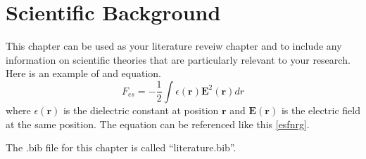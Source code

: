 \chapter{Scientific Background}

This chapter can be used as your literature reveiw chapter and to include any
information on scientific theories that are particularly relevant to your
research. Here is an example of and equation.
%
\begin{equation}
    F_{es} = -\frac{1}{2} \int \epsilon(\mathbf{r}) \mathbf{E}^2(\mathbf{r}) dr
    \label{esfnrg}
\end{equation}
%
where $\epsilon(\mathbf{r})$ is the dielectric constant at position
$\mathbf{r}$ and $\mathbf{E}(\mathbf{r})$ is the electric field at the same
position. The equation can be referenced like this \ref{esfnrg}.

The .bib file for this chapter is called ``literature.bib''.
\singlespacing


\doublespacing
